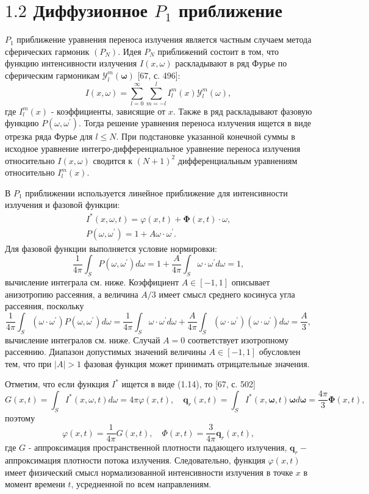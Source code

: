 \section{$1.2$ Диффузионное $P_{1}$ приближение}
$P_{1}$ приближение уравнения переноса излучения является частным случаем метода сферических гармоник $\left(P_{N}\right)$. Идея $P_{N}$ приближений состоит в том, что функцию интенсивности излучения $I(x, \omega)$ раскладывают в ряд Фурье по сферическим гармоникам $\mathcal{Y}_{l}^{m}(\boldsymbol{\omega})$ [67, с. 496]:
\[
    I(x, \omega)=\sum_{l=0}^{\infty} \sum_{m=-l}^{l} I_{l}^{m}(x) \mathcal{Y}_{l}^{m}(\omega),
\]
где $I_{l}^{m}(x)$ - коэффициенты, зависящие от $x$.
Также в ряд раскладывают фазовую функцию $P\left(\omega, \omega^{\prime}\right)$.
Тогда решение уравнения переноса излучения ищется в виде отрезка ряда Фурье для $l \leqslant N$.
При подстановке указанной конечной суммы в исходное уравнение интегро-дифференциальное уравнение
переноса излучения относительно $I(x, \omega)$ сводится к $(N+1)^{2}$ дифференциальным уравнениям
относительно $I_{l}^{m}(x)$.


В $P_{1}$ приближении используется линейное приближение для интенсивности излучения и фазовой функции:
\[
    \begin{gathered}
        I^{*}(x, \omega, t)=\varphi(x, t)+\boldsymbol{\Phi}(x, t) \cdot \omega, \\
        P\left(\omega, \omega^{\prime}\right)=1+A \omega \cdot \omega^{\prime} .
    \end{gathered}
\]
Для фазовой функции выполняется условие нормировки:
\[
    \frac{1}{4 \pi} \int_{S} P\left(\omega, \omega^{\prime}\right) d \omega=1+\frac{A}{4 \pi}
    \int_{S} \omega \cdot \omega^{\prime} d \omega=1,
\]
вычисление интеграла см. ниже. Коэффициент $A \in[-1,1]$ описывает анизотропию рассеяния,
а величина $A / 3$ имеет смысл среднего косинуса угла рассеяния, поскольку
\[
    \frac{1}{4 \pi} \int_{S}\left(\omega \cdot \omega^{\prime}\right)
    P\left(\omega, \omega^{\prime}\right) d \omega=\frac{1}{4 \pi}
    \int_{S} \omega \cdot \omega^{\prime} d \omega+\frac{A}{4 \pi}
    \int_{S}\left(\omega \cdot \omega^{\prime}\right)\left(\omega \cdot \omega^{\prime}\right) d \omega=\frac{A}{3},
\]
вычисление интегралов см. ниже. Случай $A=0$ соответствует изотропному рассеянию.
Диапазон допустимых значений величины $A \in[-1,1]$ обусловлен тем, что при $|A|>1$
фазовая функция может принимать отрицательные значения.

Отметим, что если функция $I^{*}$ ищется в виде (1.14), то [67, с. 502]
\[
    G(x, t)=\int_{S} I^{*}(x, \omega, t) d \omega=4 \pi \varphi(x, t),
    \quad \mathbf{q}_{r}(x, t)=\int_{S} I^{*}(x, \boldsymbol{\omega}, t)
    \boldsymbol{\omega} d \boldsymbol{\omega}=\frac{4 \pi}{3} \boldsymbol{\Phi}(x, t),
\]
поэтому
\[
    \varphi(x, t)=\frac{1}{4 \pi} G(x, t), \quad \Phi(x, t)=\frac{3}{4 \pi} \mathbf{q}_{r}(x, t),
\]
где $G$ - аппроксимация пространственной плотности падающего излучения,
$\mathbf{q}_{r}-$ аппроксимация плотности потока излучения.
Следовательно, функция $\varphi(x, t)$ имеет физический смысл нормализованной интенсивности излучения в
точке $x$ в момент времени $t$, усредненной по всем направлениям.


